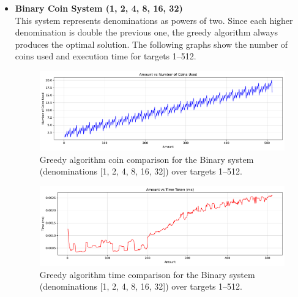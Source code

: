 \documentclass[12pt,a4paper]{report}
\begin{document}
\begin{itemize}
  \item \textbf{Binary Coin System (1, 2, 4, 8, 16, 32)}\\
  This system represents denominations as powers of two. Since each higher denomination is double the previous one, the greedy algorithm always produces the optimal solution. The following graphs show the number of coins used and execution time for targets 1--512. \\
  \begin{figure}[H]
    \centering
    \includegraphics[width=\textwidth]{graphs/greedy_coins_binary_plot.pdf}
    \caption{Greedy algorithm coin comparison for the Binary system (denominations [1, 2, 4, 8, 16, 32]) over targets 1--512.}
    \label{fig:greedy_coins_binary_plot}
  \end{figure}

  \begin{figure}[H]
    \centering
    \includegraphics[width=\textwidth]{graphs/greedy_time_binary_plot.pdf}
    \caption{Greedy algorithm time comparison for the Binary system (denominations [1, 2, 4, 8, 16, 32]) over targets 1--512.}
    \label{fig:greedy_time_binary_plot}
  \end{figure}


\end{itemize}
\end{document}
